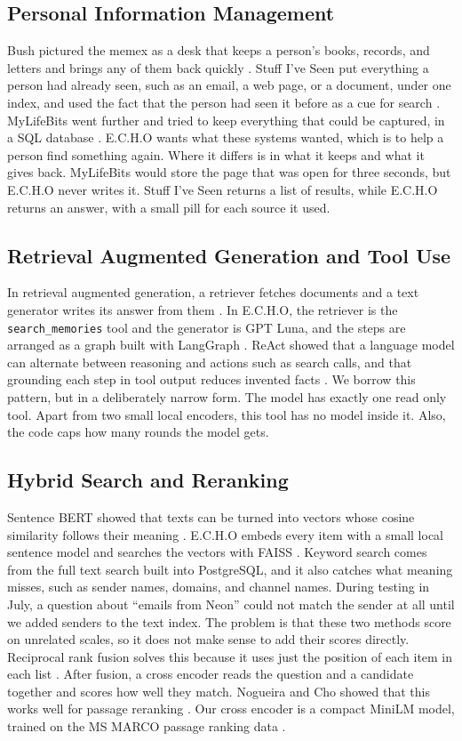 \documentclass[conference]{IEEEtran}
\newcommand{\llmname}{GPT\nobreakdash-6 Luna}
\begin{document}
\subsection{Personal Information Management}
Bush pictured the memex as a desk that keeps a person's books, records, and letters and brings any of them back quickly \cite{b1}. Stuff I've Seen put everything a person had already seen, such as an email, a web page, or a document, under one index, and used the fact that the person had seen it before as a cue for search \cite{b2}. MyLifeBits went further and tried to keep everything that could be captured, in a SQL database \cite{b3}. E.C.H.O wants what these systems wanted, which is to help a person find something again. Where it differs is in what it keeps and what it gives back. MyLifeBits would store the page that was open for three seconds, but E.C.H.O never writes it. Stuff I've Seen returns a list of results, while E.C.H.O returns an answer, with a small pill for each source it used.

\subsection{Retrieval Augmented Generation and Tool Use}
In retrieval augmented generation, a retriever fetches documents and a text generator writes its answer from them \cite{b4}. In E.C.H.O, the retriever is the \texttt{search\_memories} tool and the generator is \llmname{}, and the steps are arranged as a graph built with LangGraph \cite{b5}. ReAct showed that a language model can alternate between reasoning and actions such as search calls, and that grounding each step in tool output reduces invented facts \cite{b13}. We borrow this pattern, but in a deliberately narrow form. The model has exactly one read only tool. Apart from two small local encoders, this tool has no model inside it. Also, the code caps how many rounds the model gets.

\subsection{Hybrid Search and Reranking}
Sentence BERT showed that texts can be turned into vectors whose cosine similarity follows their meaning \cite{b6}. E.C.H.O embeds every item with a small local sentence model \cite{b16} and searches the vectors with FAISS \cite{b8}. Keyword search comes from the full text search built into PostgreSQL, and it also catches what meaning misses, such as sender names, domains, and channel names. During testing in July, a question about ``emails from Neon'' could not match the sender at all until we added senders to the text index. The problem is that these two methods score on unrelated scales, so it does not make sense to add their scores directly. Reciprocal rank fusion solves this because it uses just the position of each item in each list \cite{b9}. After fusion, a cross encoder reads the question and a candidate together and scores how well they match. Nogueira and Cho showed that this works well for passage reranking \cite{b10}. Our cross encoder is a compact MiniLM \cite{b7} model, trained on the MS MARCO passage ranking data \cite{b11}.
\end{document}
